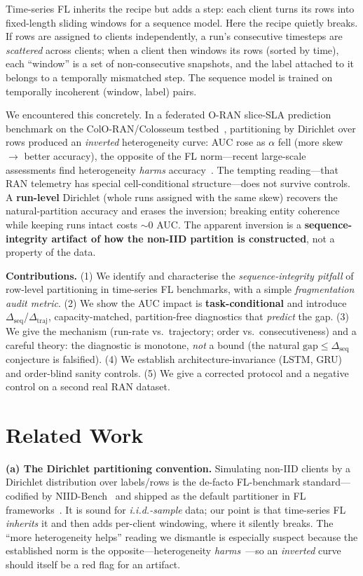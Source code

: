 \documentclass[conference]{IEEEtran}
\newcommand{\dseq}{\Delta_{\mathrm{seq}}}
\newcommand{\dtraj}{\Delta_{\mathrm{traj}}}
\begin{document}
Time-series FL inherits the recipe but adds a step: each client turns its rows into fixed-length sliding
windows for a sequence model. Here the recipe quietly breaks. If rows are assigned to clients
independently, a run's consecutive timesteps are \emph{scattered} across clients; when a client then
windows its rows (sorted by time), each ``window'' is a set of non-consecutive snapshots, and the label
attached to it belongs to a temporally mismatched step. The sequence model is trained on temporally
incoherent (window, label) pairs.

We encountered this concretely. In a federated O-RAN slice-SLA prediction benchmark on the
ColO-RAN/Colosseum testbed~\cite{Polese2022}, partitioning by Dirichlet over rows produced an
\emph{inverted} heterogeneity curve: AUC rose as $\alpha$ fell (more skew $\rightarrow$ better accuracy),
the opposite of the FL norm---recent large-scale assessments find heterogeneity \emph{harms}
accuracy~\cite{JimenezGutierrez2025_NonIID}. The tempting reading---that RAN telemetry has special
cell-conditional structure---does not survive controls. A \textbf{run-level} Dirichlet (whole runs
assigned with the same skew) recovers the natural-partition accuracy and erases the inversion; breaking
entity coherence while keeping runs intact costs ${\sim}0$ AUC. The apparent inversion is a
\textbf{sequence-integrity artifact of how the non-IID partition is constructed}, not a property of the
data.

\textbf{Contributions.} (1) We identify and characterise the \emph{sequence-integrity pitfall} of
row-level partitioning in time-series FL benchmarks, with a simple \emph{fragmentation audit metric}.
(2) We show the AUC impact is \textbf{task-conditional} and introduce $\dseq$/$\dtraj$, capacity-matched,
partition-free diagnostics that \emph{predict} the gap. (3) We give the mechanism (run-rate vs.\
trajectory; order vs.\ consecutiveness) and a careful theory: the diagnostic is monotone, \emph{not} a
bound (the natural $\text{gap}\le\dseq$ conjecture is falsified). (4) We establish architecture-invariance
(LSTM, GRU) and order-blind sanity controls. (5) We give a corrected protocol and a negative control on a
second real RAN dataset.

\section{Related Work}
\textbf{(a) The Dirichlet partitioning convention.} Simulating non-IID clients by a Dirichlet
distribution over labels/rows is the de-facto FL-benchmark standard---codified by
NIID-Bench~\cite{Li2022_NIIDBench} and shipped as the default partitioner in FL
frameworks~\cite{Beutel2020_Flower}. It is sound for \emph{i.i.d.-sample} data; our point is that
time-series FL \emph{inherits} it and then adds per-client windowing, where it silently breaks. The
``more heterogeneity helps'' reading we dismantle is especially suspect because the established norm is
the opposite---heterogeneity \emph{harms}~\cite{JimenezGutierrez2025_NonIID}---so an \emph{inverted} curve
should itself be a red flag for an artifact.
\end{document}
